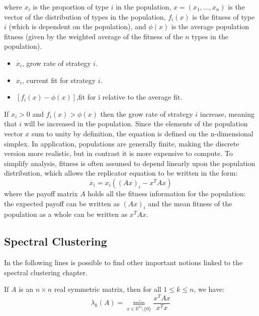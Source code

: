 where $x_i$ is the proportion of type $ i $ in the population, $x=(x_1, \ldots, x_n)$ is the vector of the distribution of types in the population, $f_i(x)$ is the fitness of type $i$ (which is dependent on the population), and $\phi(x)$ is the average population fitness (given by the weighted average of the fitness of the $n$ types in the population). 
\begin{itemize}
	\item $\dot{x_i}$, grow rate of strategy $i$.
	\item $x_i$, current fit for strategy $i$.
	\item $[ f_i(x) - \phi(x)]$,fit for i relative to the average fit.
\end{itemize}
If $x_i > 0$ and $f_i(x) > \phi(x)$ then the grow rate of strategy $i$ increase, meaning that $i$ will be increased in the population.
Since the elements of the population vector $x$ sum to unity by definition, the equation is defined on the n-dimensional simplex. In application, populations are generally finite, making the discrete version more realistic, but in contrast it is more expensive to compute.
To simplify analysis, fitness is often assumed to depend linearly upon the population distribution, which allows the replicator equation to be written in the form:
$$\dot{x_i}=x_i\left(\left(Ax\right)_i-x^TAx\right)$$
where the payoff matrix $A$ holds all the fitness information for the population: the expected payoff can be written as $\left(Ax\right)_i$ and the mean fitness of the population as a whole can be written as $x^TAx$.

\newpage
\subsection{Spectral Clustering}
In the following lines is possible to find other important notions linked to the spectral clustering chapter.

\begin{thm}{If $A$ is an $n \times n$ real symmetric matrix, then for all $1 \leq k \leq n$, we have:
	$$\lambda_k(A) = \min_{x \in \mathbb{R}^n \setminus \{0\}} \frac{x^T A x}{x^T x} $$}
\end{thm}

